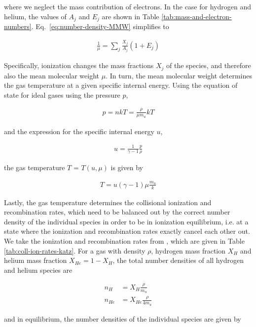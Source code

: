 where we neglect the mass contribution of electrons. In the case for hydrogen and helium, the values
of $A_j$ and $E_j$ are shown in Table \ref{tab:mass-and-electron-numbers}.
Eq.~\ref{eq:number-density-MMW} simplifies to

\begin{align}
\frac{1}{\mu} = \sum_j \frac{X_j}{A_j} (1 + E_j)
\end{align}

Specifically, ionization changes the mass fractions $X_j$ of the species, and therefore also the
mean molecular weight $\mu$. In turn, the mean molecular weight determines the gas temperature at a
given specific internal energy. Using the equation of state for ideal gases using the pressure $p$,

\begin{align}
    p = n k T = \frac{\rho}{\mu m_u} k T
\end{align}

and the expression for the specific internal energy  $u$,

\begin{align}
    u = \frac{1}{\gamma - 1} \frac{p}{\rho}
\end{align}

the gas temperature $T$ = $T(u, \mu)$ is given by

\begin{align}
    T = u (\gamma - 1) \mu \frac{m_u}{k}
\end{align}

Lastly, the gas temperature determines the collisional ionization and recombination rates, which
need to be balanced out by the correct number density of the individual species in order to be in
ionization equilibrium, i.e. at a state where the ionization and recombination rates exactly cancel
each other out. We take the ionization and recombination rates from
\citet{katzCosmologicalSimulationsTreeSPH1996}, which are given in Table
\ref{tab:coll-ion-rates-katz}. For a gas with density $\rho$, hydrogen mass fraction $X_H$ and
helium mass fraction $X_{He} = 1 - X_H$, the total number densities of all hydrogen and helium
species are

\begin{align}
    n_H &= X_H \frac{\rho}{m_u} \\
    n_{He} &= X_{He}  \frac{\rho}{4 m_u}
\end{align}

and in equilibrium, the number densities of the individual species are given by

